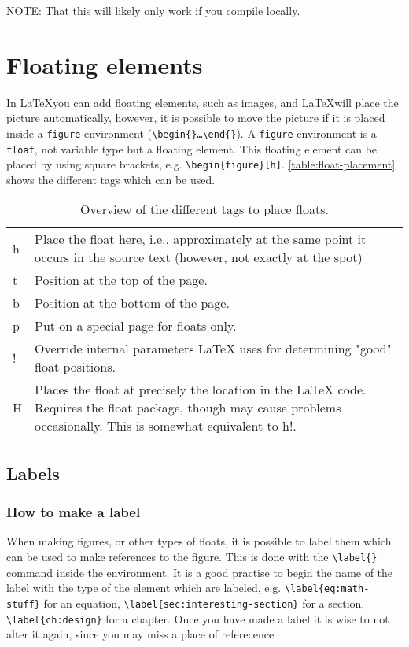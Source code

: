 NOTE: That this will likely only work if you compile locally.


\section{Floating elements}

In \LaTeX you can add floating elements, such as images, and \LaTeX will place
the picture automatically, however, it is possible to move the picture if it is
placed inside a \texttt{figure} environment
(\texttt{\textbackslash begin\{\}\dots\textbackslash end\{\}}).
A \texttt{figure} environment is a \texttt{float}, not variable type but a
floating element. This floating element can be placed by using square brackets,
e.g. \texttt{\textbackslash begin\{figure\}[h]}. \autoref{table:float-placement}
shows the different tags which can be used.

\begin{table}[h]
    \begin{tabular}{p{} p{}}
        h & Place the float here, i.e., approximately at the same point it occurs in the source text (however, not exactly at the spot)\\
        t & Position at the top of the page.\\
        b & Position at the bottom of the page.\\
        p & Put on a special page for floats only.\\
        ! & Override internal parameters LaTeX uses for determining "good" float positions.\\
        H & Places the float at precisely the location in the LaTeX code. Requires the float package, though may cause problems occasionally. This is somewhat equivalent to h!. 
    \end{tabular}
    \caption{Overview of the different tags to place floats.}
    \label{table:float-placement}
\end{table}

\subsection{Labels}
\subsubsection*{How to make a label}

When making figures, or other types of floats, it is possible to label them
which can be used to make references to the figure. This is done with the
\texttt{\textbackslash label\{\}} command inside the environment.
It is a good practise to begin the name of the label with the type of the
element which are labeled, e.g. \texttt{\textbackslash label\{eq:math-stuff\}}
for an equation, \texttt{\textbackslash label\{sec:interesting-section\}} for a
section, \texttt{\textbackslash label\{ch:design\}} for a chapter.
Once you have made a label it is wise to not alter it again, since you may miss
a place of referecence

